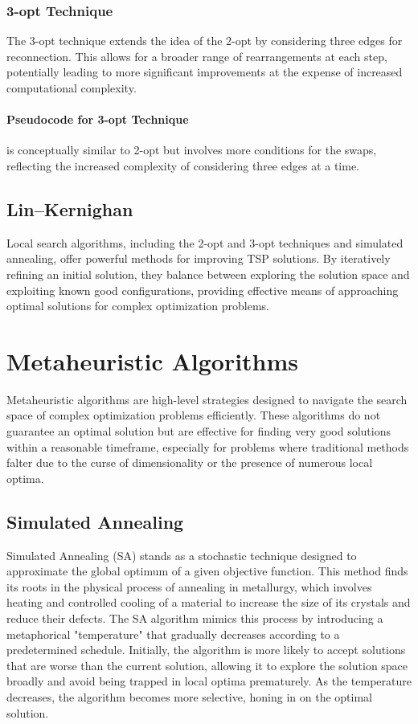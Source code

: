 \subsubsection{3-opt Technique}

The 3-opt technique extends the idea of the 2-opt by considering three edges for reconnection. This allows for a broader range of rearrangements at each step, potentially leading to more significant improvements at the expense of increased computational complexity.

\paragraph{Pseudocode for 3-opt Technique} is conceptually similar to 2-opt but involves more conditions for the swaps, reflecting the increased complexity of considering three edges at a time.

\subsection{Lin–Kernighan}


Local search algorithms, including the 2-opt and 3-opt techniques and simulated annealing, offer powerful methods for improving TSP solutions. By iteratively refining an initial solution, they balance between exploring the solution space and exploiting known good configurations, providing effective means of approaching optimal solutions for complex optimization problems.



\section{Metaheuristic Algorithms}

Metaheuristic algorithms are high-level strategies designed to navigate the search space of complex optimization problems efficiently. These algorithms do not guarantee an optimal solution but are effective for finding very good solutions within a reasonable timeframe, especially for problems where traditional methods falter due to the curse of dimensionality or the presence of numerous local optima.
\subsection{Simulated Annealing}

Simulated Annealing (SA) stands as a stochastic technique designed to approximate the global optimum of a given objective function. This method finds its roots in the physical process of annealing in metallurgy, which involves heating and controlled cooling of a material to increase the size of its crystals and reduce their defects. The SA algorithm mimics this process by introducing a metaphorical "temperature" that gradually decreases according to a predetermined schedule. Initially, the algorithm is more likely to accept solutions that are worse than the current solution, allowing it to explore the solution space broadly and avoid being trapped in local optima prematurely. As the temperature decreases, the algorithm becomes more selective, honing in on the optimal solution.

